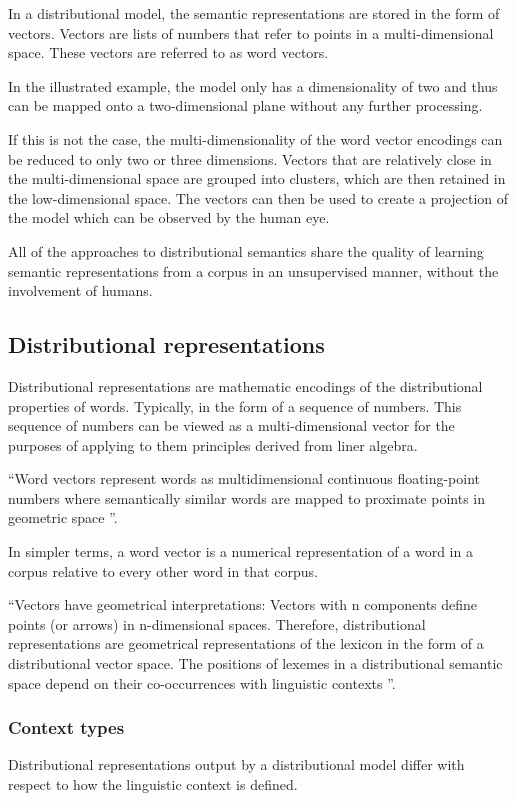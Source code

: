 \documentclass[14pt, a4paper]{extreport}
\begin{document}
In a distributional model, the semantic representations are stored in the form of vectors. Vectors are lists of numbers that refer to points in a multi-dimensional space. These vectors are referred to as word vectors.

In the illustrated example, the model only has a dimensionality of two and thus can be mapped onto a two-dimensional plane without any further processing.

If this is not the case, the multi-dimensionality of the word vector encodings can be reduced to only two or three dimensions. Vectors that are relatively close in the multi-dimensional space are grouped into clusters, which are then retained in the low-dimensional space. The vectors can then be used to create a projection of the model which can be observed by the human eye.

All of the approaches to distributional semantics share the quality of learning semantic representations from a corpus in an unsupervised manner, without the involvement of humans.
    \subsection{Distributional representations}
Distributional representations are mathematic encodings of the distributional properties of words. Typically, in the form of a sequence of numbers. This sequence of numbers can be viewed as a multi-dimensional vector for the purposes of applying to them principles derived from liner algebra.

``Word vectors represent words as multidimensional continuous floating-point numbers where semantically similar words are mapped to proximate points in geometric space \parencite{ahireintro}''.

In simpler terms, a word vector is a numerical representation of a word in a corpus relative to every other word in that corpus.

``Vectors have geometrical interpretations: Vectors with n components define points (or arrows) in n-dimensional spaces. Therefore, distributional representations are geometrical representations of the lexicon in the form of a distributional vector space. The positions of lexemes in a distributional semantic space depend on their co-occurrences with linguistic contexts \parencite{lenci}''.
      \subsubsection{Context types}
Distributional representations output by a distributional model differ with respect to how the linguistic context is defined.
\end{document}

